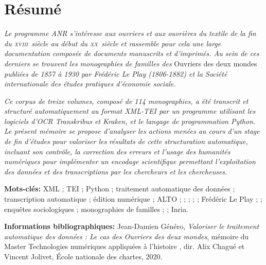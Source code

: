 \section*{Résumé}

\bigbreak

\textit{Le programme ANR \timeus{} s’intéresse aux ouvriers et aux ouvrières du textile de la fin du \textsc{xviii}\ieme ~siècle au début du \textsc{xx}\ieme ~siècle et rassemble pour cela une large documentation composée de documents manuscrits et d'imprimés. Au sein de ces derniers se trouvent les monographies de familles des} Ouvriers des deux mondes \textit{publiées de 1857 à 1930 par Frédéric Le Play (1806-1882) et la Société internationale des études pratiques d’économie sociale.}

\textit{Ce corpus de treize volumes, composé de 114 monographies, a été transcrit et structuré automatiquement au format XML-TEI par un programme utilisant les logiciels d’OCR Transkribus et Kraken, et le langage de programmation Python. Le présent mémoire se propose d'analyser les actions menées au cours d'un stage de fin d'études pour valoriser les résultats de cette structuration automatique, incluant son contrôle, la correction des erreurs et l’usage des humanités numériques pour implémenter un encodage scientifique permettant l’exploitation des données et des transcriptions par les chercheurs et les chercheuses.}

\bigbreak

\bigbreak

\bigbreak

\textbf{Mots-clés:} XML ; TEI ; Python ; traitement automatique des données ; transcription automatique ; édition numérique ; ALTO ; \ocr ; \kraken{} ; \transkribus{} ; \gitlab{} ; Frédéric Le Play ; \lodm{} ; enquêtes sociologiques ; monographies de familles ; \timeus{} ; Inria.

\bigbreak

\bigbreak

\bigbreak

\textbf{Informations bibliographiques:} Jean-Damien Généro, \textit{Valoriser le traitement automatique des données : Le cas des Ouvriers des deux mondes}, mémoire du Master \og Technologies numériques appliquées à l'histoire \fg{}, dir. Alix Chagué et Vincent Jolivet, École nationale des chartes, 2020.